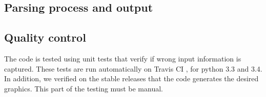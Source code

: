 \subsection*{Parsing process and output}

\subsection*{Quality control}

    The code is tested using unit tests that verify if wrong input information
    is captured. These tests are run automatically on Travis CI
    \cite{url:travis}, for python 3.3 and 3.4.
    In addition, we verified on the stable releases that the code generates the
    desired graphics. This part of the testing must be manual.


